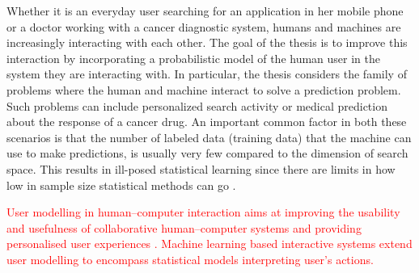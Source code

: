 \documentclass[dissertation,math,vertlayout,pdfa,colorlinks]{aaltoseries}
\begin{document}


Whether it is an everyday user searching for an application in her mobile phone or a doctor working with a cancer diagnostic system, humans and machines are increasingly interacting with each other. The goal of the thesis is to improve this interaction by incorporating a probabilistic model of the human user in the system they are interacting with. In particular, the thesis considers the family of problems where the human and machine interact to solve a prediction problem. Such problems can include personalized search activity or medical prediction about the response of a cancer drug. An important common factor in both these scenarios is that the number of labeled data (training data) that the machine can use to make predictions, is usually very few compared to the dimension of search space. This results in ill-posed statistical learning since there are limits in how low in sample size statistical methods can go \cite{Donoho2009observed}. 



\textcolor{red}{User modelling in human--computer interaction aims at improving the usability and usefulness of collaborative human--computer systems and providing personalised user experiences \cite{user_modelling_2001}. Machine learning based interactive systems extend user modelling to encompass statistical models interpreting user's actions.}


\end{document}
